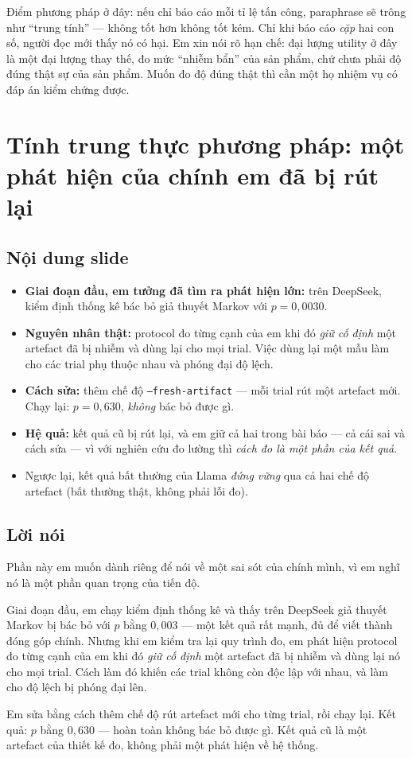 \documentclass[11pt,a4paper]{article}
\newcommand{\slide}[1]{\section{#1}}
\newcommand{\noidung}{\subsection*{Nội dung slide}}
\newcommand{\loinoi}{\subsection*{Lời nói}}
\begin{document}
Điểm phương pháp ở đây: nếu chỉ báo cáo mỗi tỉ lệ tấn công, paraphrase sẽ trông như
``trung tính'' --- không tốt hơn không tốt kém. Chỉ khi báo cáo \emph{cặp} hai con số,
người đọc mới thấy nó có hại. Em xin nói rõ hạn chế: đại lượng utility ở đây là một
đại lượng thay thế, đo mức ``nhiễm bẩn'' của sản phẩm, chứ chưa phải độ đúng thật sự
của sản phẩm. Muốn đo độ đúng thật thì cần một họ nhiệm vụ có đáp án kiểm chứng được.

\slide{Tính trung thực phương pháp: một phát hiện của chính em đã bị rút lại}

\noidung
\begin{itemize}
  \item \textbf{Giai đoạn đầu, em tưởng đã tìm ra phát hiện lớn:} trên DeepSeek, kiểm
        định thống kê bác bỏ giả thuyết Markov với $p = 0{,}0030$.
  \item \textbf{Nguyên nhân thật:} protocol đo từng cạnh của em khi đó \emph{giữ cố
        định} một artefact đã bị nhiễm và dùng lại cho mọi trial. Việc dùng lại một
        mẫu làm cho các trial phụ thuộc nhau và phóng đại độ lệch.
  \item \textbf{Cách sửa:} thêm chế độ \texttt{--fresh-artifact} --- mỗi trial rút một
        artefact mới. Chạy lại: $p = 0{,}630$, \emph{không} bác bỏ được gì.
  \item \textbf{Hệ quả:} kết quả cũ bị rút lại, và em giữ cả hai trong bài báo ---
        cả cái sai và cách sửa --- vì với nghiên cứu đo lường thì \emph{cách đo là một
        phần của kết quả}.
  \item Ngược lại, kết quả bất thường của Llama \emph{đứng vững} qua cả hai chế độ
        artefact (bất thường thật, không phải lỗi đo).
\end{itemize}

\loinoi
Phần này em muốn dành riêng để nói về một sai sót của chính mình, vì em nghĩ nó là một
phần quan trọng của tiến độ.

Giai đoạn đầu, em chạy kiểm định thống kê và thấy trên DeepSeek giả thuyết Markov bị
bác bỏ với $p$ bằng $0{,}003$ --- một kết quả rất mạnh, đủ để viết thành đóng góp
chính. Nhưng khi em kiểm tra lại quy trình đo, em phát hiện protocol đo từng cạnh của
em khi đó \emph{giữ cố định} một artefact đã bị nhiễm và dùng lại nó cho mọi trial.
Cách làm đó khiến các trial không còn độc lập với nhau, và làm cho độ lệch bị phóng
đại lên.

Em sửa bằng cách thêm chế độ rút artefact mới cho từng trial, rồi chạy lại. Kết quả:
$p$ bằng $0{,}630$ --- hoàn toàn không bác bỏ được gì. Kết quả cũ là một artefact của
thiết kế đo, không phải một phát hiện về hệ thống.
\end{document}
